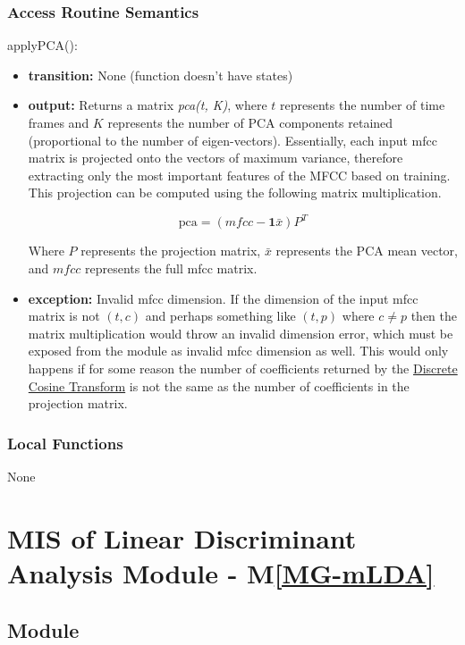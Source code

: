 \documentclass[12pt, titlepage]{article}
\newcommand{\mref}[1]{M\ref{#1}}
\begin{document}
\subsubsection{Access Routine Semantics}

\noindent applyPCA():
\begin{itemize}
\item \textbf{transition:} None (function doesn't have states)
\item \textbf{output:} Returns a matrix \textit{pca(t, K)}, where $t$ represents
  the number of time frames and $K$ represents the number of PCA components
  retained (proportional to the number of eigen-vectors). Essentially, each input
  mfcc matrix is projected onto the vectors of maximum variance, therefore
  extracting only the most important features of the MFCC based on training.
  This projection can be computed using the following matrix multiplication. 

  \[
  \text{pca} = \left( mfcc - \mathbf{1}\bar{x} \right) P^{T}
  \]

  Where $P$ represents the projection matrix, $\bar{x}$ represents the PCA mean
  vector, and $mfcc$ represents the full mfcc matrix. 
\item \textbf{exception:} Invalid mfcc dimension. If the dimension of the input
  mfcc matrix is not $(t,c)$ and perhaps something like $(t,p)$ where $c \neq p$
  then the matrix multiplication would throw an invalid dimension error, which
  must be exposed from the module as invalid mfcc dimension as well. This would
  only happens if for some reason the number of coefficients returned by the
  \hyperref[MG-mDCT]{Discrete Cosine Transform} is not the same as the number of
  coefficients in the projection matrix.
\end{itemize}

\subsubsection{Local Functions}

None

\newpage 

\section{MIS of Linear Discriminant Analysis Module \label{mod:LDA} -
\mref{MG-mLDA}}

\subsection{Module}
\end{document}

